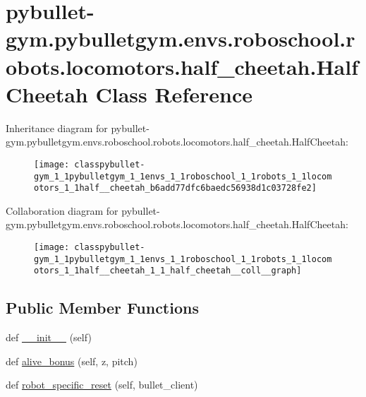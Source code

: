\hypertarget{classpybullet-gym_1_1pybulletgym_1_1envs_1_1roboschool_1_1robots_1_1locomotors_1_1half__cheetah_1_1_half_cheetah}{}\section{pybullet-\/gym.pybulletgym.\+envs.\+roboschool.\+robots.\+locomotors.\+half\+\_\+cheetah.\+Half\+Cheetah Class Reference}
\label{classpybullet-gym_1_1pybulletgym_1_1envs_1_1roboschool_1_1robots_1_1locomotors_1_1half__cheetah_1_1_half_cheetah}


Inheritance diagram for pybullet-\/gym.pybulletgym.\+envs.\+roboschool.\+robots.\+locomotors.\+half\+\_\+cheetah.\+Half\+Cheetah\+:
\nopagebreak
\begin{figure}[H]
\begin{center}
\leavevmode
\texttt{[image: classpybullet-gym\_1\_1pybulletgym\_1\_1envs\_1\_1roboschool\_1\_1robots\_1\_1locomotors\_1\_1half\_\_cheetah\_b6add77dfc6baedc56938d1c03728fe2]}
\end{center}
\end{figure}


Collaboration diagram for pybullet-\/gym.pybulletgym.\+envs.\+roboschool.\+robots.\+locomotors.\+half\+\_\+cheetah.\+Half\+Cheetah\+:
\nopagebreak
\begin{figure}[H]
\begin{center}
\leavevmode
\texttt{[image: classpybullet-gym\_1\_1pybulletgym\_1\_1envs\_1\_1roboschool\_1\_1robots\_1\_1locomotors\_1\_1half\_\_cheetah\_1\_1\_half\_cheetah\_\_coll\_\_graph]}
\end{center}
\end{figure}
\subsection*{Public Member Functions}
\begin{DoxyCompactItemize}
\item 
def \hyperlink{classpybullet-gym_1_1pybulletgym_1_1envs_1_1roboschool_1_1robots_1_1locomotors_1_1half__cheetah_1_1_half_cheetah_a749a2f252395e629e4fcb953d6803813}{\+\_\+\+\_\+init\+\_\+\+\_\+} (self)
\item 
def \hyperlink{classpybullet-gym_1_1pybulletgym_1_1envs_1_1roboschool_1_1robots_1_1locomotors_1_1half__cheetah_1_1_half_cheetah_a7c9fe609616ebf9ed2fb1b064b4b77f1}{alive\+\_\+bonus} (self, z, pitch)
\item 
def \hyperlink{classpybullet-gym_1_1pybulletgym_1_1envs_1_1roboschool_1_1robots_1_1locomotors_1_1half__cheetah_1_1_half_cheetah_a42bb3d729ec9cd86165ad2409b6a1992}{robot\+\_\+specific\+\_\+reset} (self, bullet\+\_\+client)
\end{DoxyCompactItemize}
